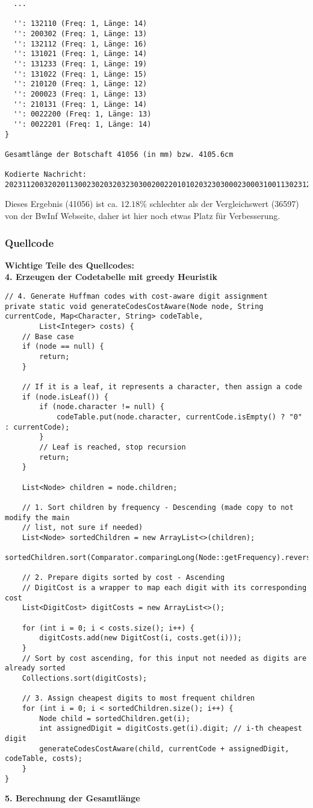 \documentclass[a4paper,10pt,ngerman]{scrartcl}
\begin{document}
\begin{enumerate}
\begin{verbatim}
  ...

  '': 132110 (Freq: 1, Länge: 14)
  '': 200302 (Freq: 1, Länge: 13)
  '': 132112 (Freq: 1, Länge: 16)
  '': 131021 (Freq: 1, Länge: 14)
  '': 131233 (Freq: 1, Länge: 19)
  '': 131022 (Freq: 1, Länge: 15)
  '': 210120 (Freq: 1, Länge: 12)
  '': 200023 (Freq: 1, Länge: 13)
  '': 210131 (Freq: 1, Länge: 14)
  '': 0022200 (Freq: 1, Länge: 13)
  '': 0022201 (Freq: 1, Länge: 14)
}

Gesamtlänge der Botschaft 41056 (in mm) bzw. 4105.6cm

Kodierte Nachricht: 2023112003202011300230203203230300200220101020323030002300031001130231231112...
\end{verbatim}
Dieses Ergebnis (41056) ist ca. $12.18\%$ schlechter als der Vergleichswert (36597) von der BwInf Webseite, daher ist hier noch etwas Platz für Verbesserung.
\end{enumerate}
\subsubsection{Quellcode}
\textbf{Wichtige Teile des Quellcodes:}\\

\textbf{4. Erzeugen der Codetabelle mit greedy Heuristik}
\begin{lstlisting}
// 4. Generate Huffman codes with cost-aware digit assignment
private static void generateCodesCostAware(Node node, String currentCode, Map<Character, String> codeTable,
        List<Integer> costs) {
    // Base case
    if (node == null) {
        return;
    }

    // If it is a leaf, it represents a character, then assign a code
    if (node.isLeaf()) {
        if (node.character != null) {
            codeTable.put(node.character, currentCode.isEmpty() ? "0" : currentCode);
        }
        // Leaf is reached, stop recursion
        return;
    }

    List<Node> children = node.children;

    // 1. Sort children by frequency - Descending (made copy to not modify the main
    // list, not sure if needed)
    List<Node> sortedChildren = new ArrayList<>(children);
    sortedChildren.sort(Comparator.comparingLong(Node::getFrequency).reversed());

    // 2. Prepare digits sorted by cost - Ascending
    // DigitCost is a wrapper to map each digit with its corresponding cost
    List<DigitCost> digitCosts = new ArrayList<>();

    for (int i = 0; i < costs.size(); i++) {
        digitCosts.add(new DigitCost(i, costs.get(i)));
    } 
    // Sort by cost ascending, for this input not needed as digits are already sorted
    Collections.sort(digitCosts);

    // 3. Assign cheapest digits to most frequent children
    for (int i = 0; i < sortedChildren.size(); i++) {
        Node child = sortedChildren.get(i);
        int assignedDigit = digitCosts.get(i).digit; // i-th cheapest digit
        generateCodesCostAware(child, currentCode + assignedDigit, codeTable, costs);
    }
}
\end{lstlisting}
\textbf{5. Berechnung der Gesamtlänge}
\end{document}
